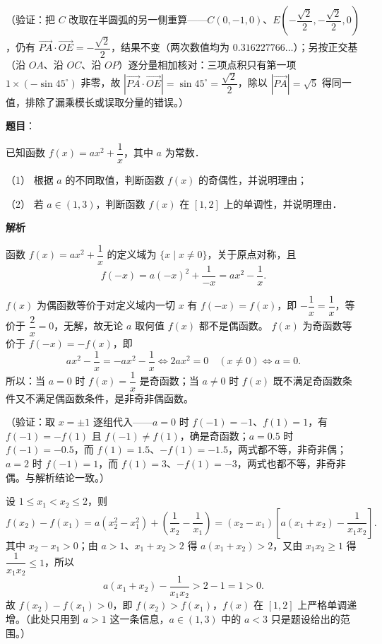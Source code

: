 \begin{answer}
（验证：把 \(C\) 改取在半圆弧的另一侧重算——\(C(0,-1,0)\)、\(E\left(-\dfrac{\sqrt2}{2},-\dfrac{\sqrt2}{2},0\right)\)，仍有 \(\overrightarrow{PA}\cdot\overrightarrow{OE}=-\dfrac{\sqrt2}{2}\)，结果不变（两次数值均为 \(0.316227766\ldots\)）；另按正交基（沿 \(OA\)、沿 \(OC\)、沿 \(OP\)）逐分量相加核对：三项点积只有第一项 \(1\times(-\sin45^{\circ})\) 非零，故 \(\left|\overrightarrow{PA}\cdot\overrightarrow{OE}\right|=\sin45^{\circ}=\dfrac{\sqrt2}{2}\)，除以 \(|\overrightarrow{PA}|=\sqrt5\) 得同一值，排除了漏乘模长或误取分量的错误。）


\end{answer}
\begin{answer}

\textbf{题目}：

已知函数 \(f(x)=ax^{2}+\dfrac{1}{x}\)，其中 \(a\) 为常数．

（1） 根据 \(a\) 的不同取值，判断函数 \(f(x)\) 的奇偶性，并说明理由；

（2） 若 \(a\in(1,3)\)，判断函数 \(f(x)\) 在 \([1,2]\) 上的单调性，并说明理由．

\textbf{解析}

函数 \(f(x)=ax^{2}+\dfrac{1}{x}\) 的定义域为 \(\{x\mid x\neq0\}\)，关于原点对称，且
\nopagebreak[4]
\[
f(-x)=a(-x)^{2}+\frac{1}{-x}=ax^{2}-\frac{1}{x}.
\]


\(f(x)\) 为偶函数等价于对定义域内一切 \(x\) 有 \(f(-x)=f(x)\)，即 \(-\dfrac{1}{x}=\dfrac{1}{x}\)，等价于 \(\dfrac{2}{x}=0\)，无解，故无论 \(a\) 取何值 \(f(x)\) 都不是偶函数。
\(f(x)\) 为奇函数等价于 \(f(-x)=-f(x)\)，即
\nopagebreak[4]
\[
ax^{2}-\frac{1}{x}=-ax^{2}-\frac{1}{x}\iff2ax^{2}=0\quad(x\neq0)\iff a=0.
\]
所以：当 \(a=0\) 时 \(f(x)=\dfrac{1}{x}\) 是奇函数；当 \(a\neq0\) 时 \(f(x)\) 既不满足奇函数条件又不满足偶函数条件，是非奇非偶函数。

（验证：取 \(x=\pm1\) 逐组代入——\(a=0\) 时 \(f(-1)=-1\)、\(f(1)=1\)，有 \(f(-1)=-f(1)\) 且 \(f(-1)\neq f(1)\)，确是奇函数；\(a=0.5\) 时 \(f(-1)=-0.5\)，而 \(f(1)=1.5\)、\(-f(1)=-1.5\)，两式都不等，非奇非偶；\(a=2\) 时 \(f(-1)=1\)，而 \(f(1)=3\)、\(-f(1)=-3\)，两式也都不等，非奇非偶。与解析结论一致。）


设 \(1\leqslant x_{1}<x_{2}\leqslant2\)，则
\nopagebreak[4]
\[
f(x_{2})-f(x_{1})=a\left(x_{2}^{2}-x_{1}^{2}\right)+\left(\frac{1}{x_{2}}-\frac{1}{x_{1}}\right)=(x_{2}-x_{1})\left[a(x_{1}+x_{2})-\frac{1}{x_{1}x_{2}}\right].
\]
其中 \(x_{2}-x_{1}>0\)；由 \(a>1\)、\(x_{1}+x_{2}>2\) 得 \(a(x_{1}+x_{2})>2\)，又由 \(x_{1}x_{2}\geqslant1\) 得 \(\dfrac{1}{x_{1}x_{2}}\leqslant1\)，所以
\nopagebreak[4]
\[
a(x_{1}+x_{2})-\frac{1}{x_{1}x_{2}}>2-1=1>0.
\]
故 \(f(x_{2})-f(x_{1})>0\)，即 \(f(x_{2})>f(x_{1})\)，\(f(x)\) 在 \([1,2]\) 上严格单调递增。（此处只用到 \(a>1\) 这一条信息，\(a\in(1,3)\) 中的 \(a<3\) 只是题设给出的范围。）


\end{answer}
